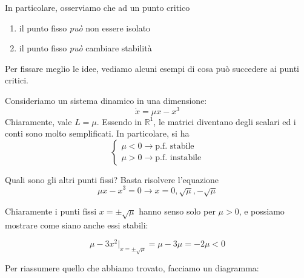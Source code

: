 \documentclass{report}
\begin{document}
In particolare, osserviamo che ad un punto critico
\begin{enumerate}
    \item il punto fisso \emph{può} non essere isolato
    \item il punto fisso \emph{può} cambiare stabilità
\end{enumerate}

Per fissare meglio le idee, vediamo alcuni esempi di cosa può succedere ai punti critici. \\ 
\begin{example}
    Consideriamo un sistema dinamico in una dimensione: 
    \begin{equation}
        \dot{x} = \mu x - x^3
    \end{equation}
    Chiaramente, vale $L = \mu$. Essendo in $\mathbb{R}^1$, le matrici diventano degli scalari ed i conti sono molto semplificati. In particolare, si ha
    \[\begin{cases}
        \mu <0 \rightarrow \text{p.f. stabile} \\ \mu >0 \rightarrow \text{p.f. instabile}
    \end{cases}\]

    Quali sono gli altri punti fissi? Basta risolvere l'equazione 
    \begin{equation}
        \mu x - x^3 =0 \rightarrow x=0, \sqrt{\mu}, -\sqrt{\mu}
    \end{equation}

    Chiaramente i punti fissi $x = \pm \sqrt{\mu}$ hanno senso solo per $\mu >0$, e possiamo mostrare come siano anche essi stabili: 

    \begin{equation}
        \mu - 3x^2|_{x = \pm \sqrt{\mu}} = \mu - 3\mu = -2\mu <0 
    \end{equation}

    Per riassumere quello che abbiamo trovato, facciamo un diagramma: 

    \begin{center}
\end{center}
\end{example}
\end{document}
